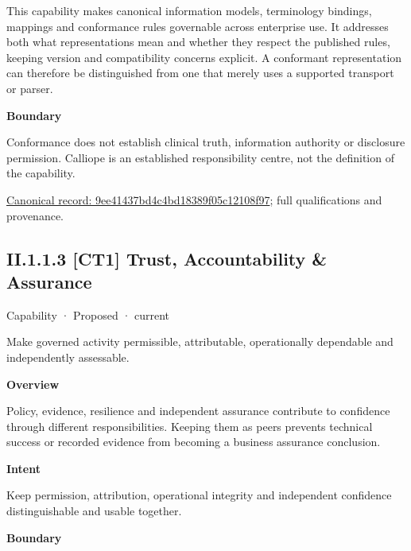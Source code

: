 This capability makes canonical information models, terminology bindings, mappings and conformance rules governable across enterprise use. It addresses both what representations mean and whether they respect the published rules, keeping version and compatibility concerns explicit. A conformant representation can therefore be distinguished from one that merely uses a supported transport or parser.



\textbf{Boundary}



Conformance does not establish clinical truth, information authority or disclosure permission. Calliope is an established responsibility centre, not the definition of the capability.


{\footnotesize \href{../../../../../../../continuum/strategy/capability/9ee41437bd4c4bd18389f05c12108f97.md}{Canonical record: 9ee41437bd4c4bd18389f05c12108f97}; full qualifications and provenance.}\par
\subsection*{II.1.1.3 [CT1] Trust, Accountability \& Assurance}
\label{navigation:II.1.1.3}

\label{element:321de197612f49089d8b4a4cc1a2e003}
{\small Capability · Proposed · current}\par

Make governed activity permissible, attributable, operationally dependable and independently assessable.



\textbf{Overview}



Policy, evidence, resilience and independent assurance contribute to confidence through different responsibilities. Keeping them as peers prevents technical success or recorded evidence from becoming a business assurance conclusion.



\textbf{Intent}



Keep permission, attribution, operational integrity and independent confidence distinguishable and usable together.



\textbf{Boundary}



